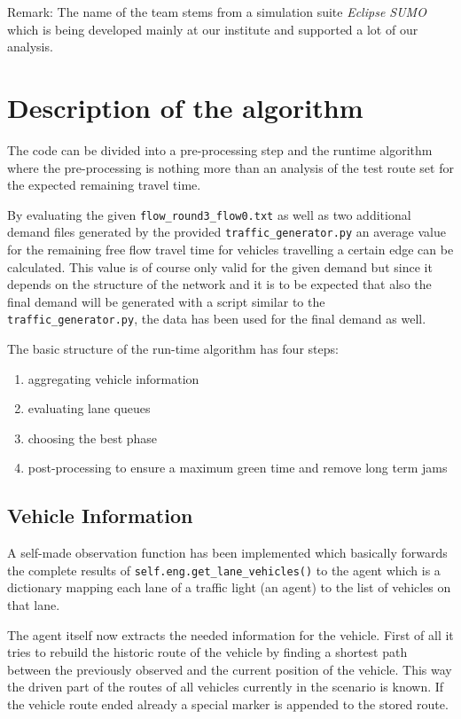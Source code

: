 \documentclass[sigconf,authordraft]{acmart}
\begin{document}
Remark: The name of the team stems from a simulation suite \emph{Eclipse SUMO} which is being
developed mainly at our institute and supported a lot of our analysis.

\section{Description of the algorithm}

The code can be divided into a pre-processing step and the runtime algorithm
where the pre-processing is nothing more than an analysis of the test route set
for the expected remaining travel time.

By evaluating the given 
\texttt{flow\_round3\_flow0.txt} as well as two additional demand files generated 
by the provided \texttt{traffic\_generator.py} an average value for the remaining 
free flow travel time for vehicles travelling a certain edge can be calculated.
This value is of course only valid for
the given demand but since it depends on the structure of the network and it is
to be expected that also the final demand will be generated with a script similar
to the \texttt{traffic\_generator.py}, the data has been used for the final demand as well.

The basic structure of the run-time algorithm has four steps:
\begin{enumerate}
    \item aggregating vehicle information
    \item evaluating lane queues
    \item choosing the best phase
    \item post-processing to ensure a maximum green time and remove long term jams
\end{enumerate}

\subsection{Vehicle Information}
A self-made observation function has been implemented which basically forwards
the complete results of \texttt{self.eng.get\_lane\_vehicles()} to the agent
which is a dictionary mapping each lane of a traffic light (an agent) to the list
of vehicles on that lane.

The agent itself now extracts the needed information for the vehicle. First of all
it tries to rebuild the historic route of the vehicle by finding a shortest path between
the previously observed and the current position of the vehicle. This way the driven part
of the routes of all vehicles currently in the scenario is known. If the vehicle route
ended already a special marker is appended to the stored route.
\end{document}

